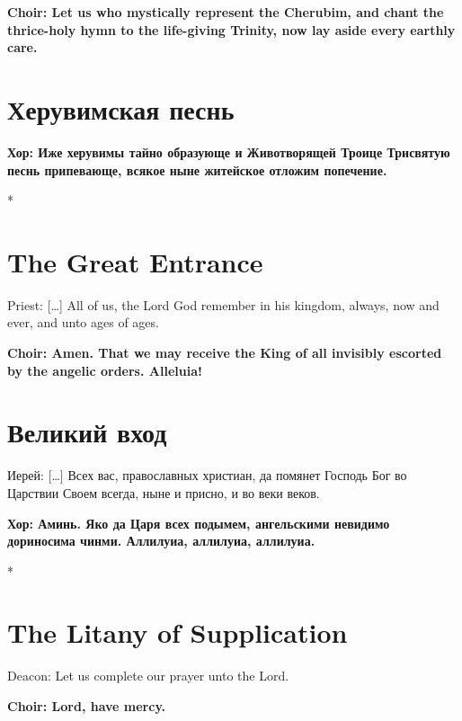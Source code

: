 \documentclass[12pt,a4paper,titlepage]{report}
\begin{document}
\begin{paracol}[1]{2}
  \textbf{Choir: Let us who mystically represent the Cherubim, and chant the thrice-holy hymn to the life-giving Trinity, now lay aside every earthly care.}

  \switchcolumn[1]

  \section*{Херувимская песнь}

  \textbf{Хор: Иже херувимы тайно образующе и Животворящей Троице Трисвятую песнь припевающе, всякое ныне житейское отложим попечение.}

  \switchcolumn[0]*

  \section*{The Great Entrance}

  Priest: [\ldots] All of us, the Lord God remember in his kingdom, always, now and ever, and unto ages of ages.

  \textbf{Choir: Amen. That we may receive the King of all invisibly escorted by the angelic orders. Alleluia!}

  \switchcolumn[1]

  \section*{Великий вход}

  Иерей: [\ldots] Всех вас, православных христиан, да помянет Господь Бог во Царствии Своем всегда, ныне и присно, и во веки веков.

  \textbf{Хор: Аминь. Яко да Царя всех подымем, ангельскими невидимо дориносима чинми. Аллилуиа, аллилуиа, аллилуиа.}

  \switchcolumn[0]*

  \section*{The Litany of Supplication}

  Deacon: Let us complete our prayer unto the Lord.

  \textbf{Choir: Lord, have mercy.}


\end{paracol}
\end{document}
